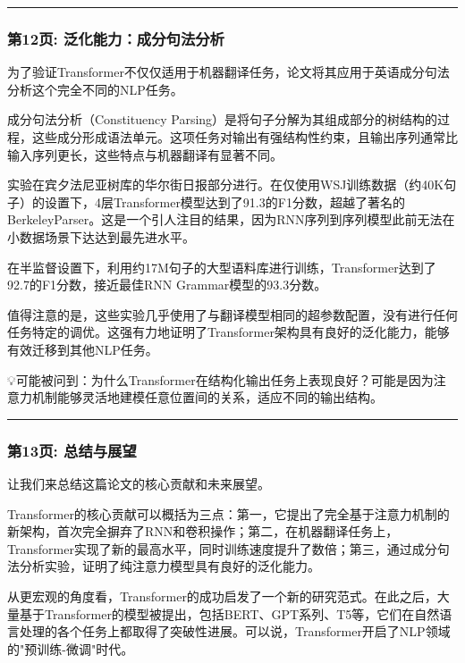\documentclass[11pt,a4paper]{article}
\begin{document}
\vspace{0.5em}\noindent\rule{\textwidth}{0.4pt}\vspace{0.5em}

\subsubsection*{第12页: 泛化能力：成分句法分析}

为了验证Transformer不仅仅适用于机器翻译任务，论文将其应用于英语成分句法分析这个完全不同的NLP任务。

成分句法分析（Constituency Parsing）是将句子分解为其组成部分的树结构的过程，这些成分形成语法单元。这项任务对输出有强结构性约束，且输出序列通常比输入序列更长，这些特点与机器翻译有显著不同。

实验在宾夕法尼亚树库的华尔街日报部分进行。在仅使用WSJ训练数据（约40K句子）的设置下，4层Transformer模型达到了91.3的F1分数，超越了著名的BerkeleyParser。这是一个引人注目的结果，因为RNN序列到序列模型此前无法在小数据场景下达达到最先进水平。

在半监督设置下，利用约17M句子的大型语料库进行训练，Transformer达到了92.7的F1分数，接近最佳RNN Grammar模型的93.3分数。

值得注意的是，这些实验几乎使用了与翻译模型相同的超参数配置，没有进行任何任务特定的调优。这强有力地证明了Transformer架构具有良好的泛化能力，能够有效迁移到其他NLP任务。

💡可能被问到：为什么Transformer在结构化输出任务上表现良好？可能是因为注意力机制能够灵活地建模任意位置间的关系，适应不同的输出结构。

\vspace{0.5em}\noindent\rule{\textwidth}{0.4pt}\vspace{0.5em}

\subsubsection*{第13页: 总结与展望}

让我们来总结这篇论文的核心贡献和未来展望。

Transformer的核心贡献可以概括为三点：第一，它提出了完全基于注意力机制的新架构，首次完全摒弃了RNN和卷积操作；第二，在机器翻译任务上，Transformer实现了新的最高水平，同时训练速度提升了数倍；第三，通过成分句法分析实验，证明了纯注意力模型具有良好的泛化能力。

从更宏观的角度看，Transformer的成功启发了一个新的研究范式。在此之后，大量基于Transformer的模型被提出，包括BERT、GPT系列、T5等，它们在自然语言处理的各个任务上都取得了突破性进展。可以说，Transformer开启了NLP领域的"预训练-微调"时代。
\end{document}
